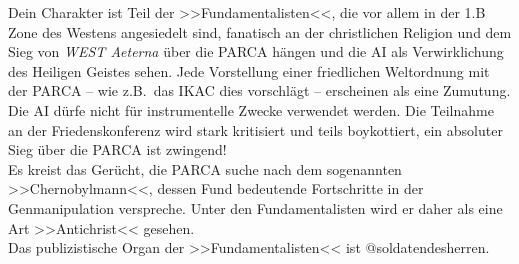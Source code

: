 Dein Charakter ist Teil der >>Fundamentalisten<<, die vor allem in der 1.B Zone
des Westens angesiedelt sind, fanatisch an der christlichen Religion und dem
Sieg von \emph{WEST Aeterna} über die PARCA hängen und die AI als Verwirklichung des Heiligen
Geistes sehen. Jede Vorstellung einer friedlichen Weltordnung mit der PARCA --
wie z.B.~das IKAC dies vorschlägt -- erscheinen als eine Zumutung. Die AI dürfe
nicht für instrumentelle Zwecke verwendet werden. Die Teilnahme an der
Friedenskonferenz wird stark kritisiert und teils boykottiert, ein absoluter
Sieg über die PARCA ist zwingend!\\
Es kreist das Gerücht, die PARCA suche nach dem sogenannten >>Chernobylmann<<,
dessen Fund bedeutende Fortschritte in der Genmanipulation verspreche. 
Unter den Fundamentalisten wird er daher als eine Art >>Antichrist<<
gesehen.\\
Das publizistische Organ der >>Fundamentalisten<< ist @soldatendesherren.
